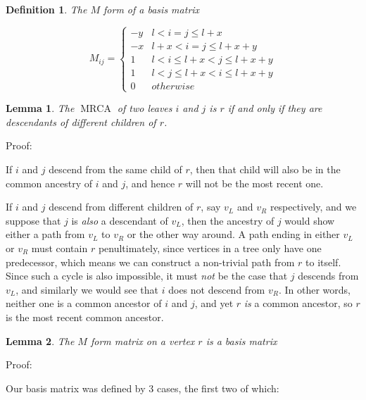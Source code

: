 \documentclass[10pt,a4paper]{report}
\DeclareMathOperator{\MRCA}{MRCA}
\newtheorem{definition}{Definition}
\newtheorem{lemma}{Lemma}
\begin{document}
\begin{definition} The $M$ form of a basis matrix

	\[ M_{ij} = \begin{cases}
		-y & l < i = j \leq l + x\\
		-x & l + x < i = j \leq l + x + y\\
		1 & l < i \leq l + x < j \leq l + x + y\\
		1 & l < j \leq l + x < i \leq l + x + y\\
		0 & otherwise
	\end{cases} \]
\end{definition}

\begin{lemma} The $\MRCA$ of two leaves $i$ and $j$ is $r$ if and only if they are descendants of different children of $r$.
\end{lemma}

Proof:

If $i$ and $j$ descend from the same child of $r$, then that child will also be in the common ancestry of $i$ and $j$, and hence $r$ will not be the most recent one.

If $i$ and $j$ descend from different children of $r$, say $v_L$ and $v_R$ respectively, and we suppose that $j$ is \emph{also} a descendant of $v_L$, then the ancestry of $j$ would show either a path from $v_L$ to $v_R$ or the other way around.
A path ending in either $v_L$ or $v_R$ must contain $r$ penultimately, since vertices in a tree only have one predecessor, which means we can construct a non-trivial path from $r$ to itself.
Since such a cycle is also impossible, it must \emph{not} be the case that $j$ descends from $v_L$, and similarly we would see that $i$ does not descend from $v_R$.
In other words, neither one is a common ancestor of $i$ and $j$, and yet $r$ \emph{is} a common ancestor, so $r$ is the most recent common ancestor.

\begin{lemma} The $M$ form matrix on a vertex $r$ is a basis matrix
\end{lemma}

Proof:

Our basis matrix was defined by 3 cases, the first two of which:
\end{document}
